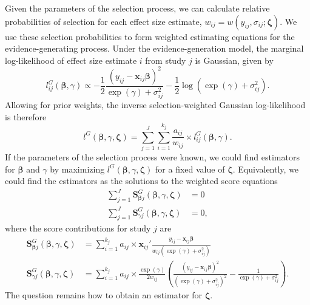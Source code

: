\documentclass[
  american,
  man, donotrepeattitle,floatsintext]{apa7}
\begin{document}
Given the parameters of the selection process, we can calculate relative probabilities of selection for each effect size estimate, \(w_{ij} = w(y_{ij}, \sigma_{ij}; \boldsymbol\zeta)\). We use these selection probabilities to form weighted estimating equations for the evidence-generating process. Under the evidence-generation model, the marginal log-likelihood of effect size estimate \(i\) from study \(j\) is Gaussian, given by
\[
l^G_{ij}(\boldsymbol\beta, \gamma) \propto - \frac{1}{2}\frac{(y_{ij} - \mathbf{x}_{ij} \boldsymbol\beta)^2}{\exp(\gamma) + \sigma_{ij}^2} - \frac{1}{2}\log(\exp(\gamma) + \sigma_{ij}^2).
\]
Allowing for prior weights, the inverse selection-weighted Gaussian log-likelihood is therefore
\begin{equation}
l^G(\boldsymbol\beta, \gamma, \boldsymbol\zeta) = \sum_{j=1}^J \sum_{i=1}^{k_j} \frac{a_{ij}} {w_{ij}} \times l^G_{ij}(\boldsymbol\beta, \gamma).
\end{equation}
If the parameters of the selection process were known, we could find estimators for \(\boldsymbol\beta\) and \(\gamma\) by maximizing \(l^G(\boldsymbol\beta, \gamma, \boldsymbol\zeta)\) for a fixed value of \(\boldsymbol\zeta\).
Equivalently, we could find the estimators as the solutions to the weighted score equations
\begin{align}
\sum_{j=1}^J \mathbf{S}^G_{\boldsymbol\beta j} (\boldsymbol\beta, \gamma, \boldsymbol\zeta) &= 0 \label{eq:hybrid-score-beta} \\
\sum_{j=1}^J \mathbf{S}^G_{\gamma j} (\boldsymbol\beta, \gamma, \boldsymbol\zeta) &= 0, \label{eq:hybrid-score-gamma}
\end{align}
where the score contributions for study \(j\) are
\begin{align}
\mathbf{S}^G_{\boldsymbol\beta j} (\boldsymbol\beta, \gamma, \boldsymbol\zeta) &= \sum_{i=1}^{k_j} a_{ij} \times \mathbf{x}_{ij}' \frac{y_{ij} - \mathbf{x}_{ij} \boldsymbol\beta}{w_{ij} \left(\exp(\gamma) + \sigma_{ij}^2\right)} \\
\mathbf{S}^G_{\gamma j} (\boldsymbol\beta, \gamma, \boldsymbol\zeta) &= \sum_{i=1}^{k_j} a_{ij} \times \frac{\exp(\gamma)}{2 w_{ij}} \left(\frac{(y_{ij} -\mathbf{x}_{ij} \boldsymbol\beta)^2}{\left(\exp(\gamma) + \sigma_{ij}^2\right)^2} - \frac{1}{\exp(\gamma) + \sigma_{ij}^2}\right).
\end{align}
The question remains how to obtain an estimator for \(\boldsymbol\zeta\).
\end{document}

